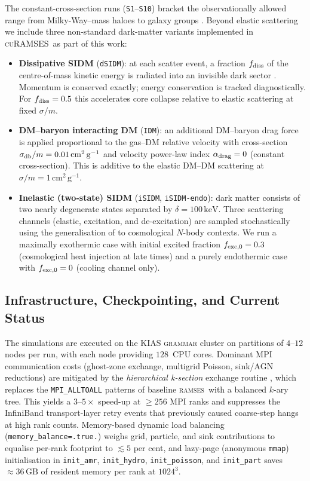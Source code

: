 \documentclass[fleqn,usenatbib]{mnras}
\newcommand{\ramses}{\textsc{ramses}}
\newcommand{\curamses}{\textsc{cuRAMSES}}
\newcommand{\code}[1]{\texttt{#1}}
\newcommand{\sigmam}{\sigma/m}
\begin{document}
The constant-cross-section runs (\code{S1}--\code{S10}) bracket the
observationally allowed range from Milky-Way--mass haloes to galaxy
groups \citep{Kaplinghat2016,Sagunski2021}.  Beyond elastic
scattering we include three non-standard dark-matter variants
implemented in \curamses\ as part of this work:
\begin{itemize}
  \item \textbf{Dissipative SIDM} (\code{dSIDM}): at each scatter
    event, a fraction $f_{\rm diss}$ of the centre-of-mass kinetic
    energy is radiated into an invisible dark sector
    \citep{Shen2021,Essig2019}.  Momentum is conserved exactly;
    energy conservation is tracked diagnostically.  For $f_{\rm
      diss}=0.5$ this accelerates core collapse relative to elastic
    scattering at fixed $\sigmam$.
  \item \textbf{DM--baryon interacting DM} (\code{IDM}): an
    additional DM--baryon drag force is applied proportional to the
    gas--DM relative velocity with cross-section $\sigma_{\rm
      db}/m = 0.01\,\mathrm{cm^2\,g^{-1}}$ and velocity power-law
    index $\alpha_{\rm drag} = 0$ (constant cross-section).  This
    is additive to the elastic DM--DM scattering at $\sigmam =
    1\,\mathrm{cm^2\,g^{-1}}$.
  \item \textbf{Inelastic (two-state) SIDM} (\code{iSIDM},
    \code{iSIDM-endo}): dark matter consists of two nearly
    degenerate states separated by $\delta = 100\,\mathrm{keV}$.
    Three scattering channels (elastic, excitation, and
    de-excitation) are sampled stochastically using the
    generalisation of \citet{Schutz2015} to cosmological $N$-body
    contexts.  We run a maximally exothermic case with initial
    excited fraction $f_{\rm exc,0}=0.3$ (cosmological heat
    injection at late times) and a purely endothermic case with
    $f_{\rm exc,0}=0$ (cooling channel only).
\end{itemize}

\subsection{Infrastructure, Checkpointing, and Current Status}
\label{sec:infrastructure}

The simulations are executed on the KIAS \textsc{grammar} cluster
on partitions of $4$--$12$ nodes per run, with each node providing
$128$~CPU cores.  Dominant MPI communication costs
(ghost-zone exchange, multigrid Poisson, sink/AGN reductions) are
mitigated by the \emph{hierarchical k-section} exchange routine
\citep{Kim2024}, which replaces the \code{MPI\_ALLTOALL} patterns
of baseline \ramses\ with a balanced $k$-ary tree.  This yields a
$3$--$5\times$ speed-up at $\ge 256$ MPI ranks and suppresses the
InfiniBand transport-layer retry events that previously caused
coarse-step hangs at high rank counts.  Memory-based dynamic load
balancing (\code{memory\_balance=.true.}) weighs grid, particle,
and sink contributions to equalise per-rank footprint to
$\lesssim 5$ per cent, and lazy-page (anonymous \code{mmap})
initialisation in \code{init\_amr}, \code{init\_hydro},
\code{init\_poisson}, and \code{init\_part} saves
$\approx 36\,\mathrm{GB}$ of resident memory per rank at
$1024^{3}$.
\end{document}
